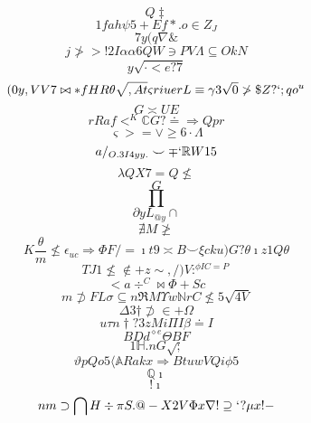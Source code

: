 \documentclass[12pt]{article}
\begin{document}
        \begin{minipage}[t][0pt]{\linewidth}

        \[Q\ddagger\]
\[1fah\psi 5 + E f * . o\in Z_{J}\]
\[7y(q\nabla\&\]
\[j\ngtr > ! 2 I\alpha {\alpha 6 Q W}\ni P V\Lambda\subseteq O k N\]
\[y\sqrt{\cdot < e ? 7}\]
\[(0y,VV7\bowtie * f H R\theta\sqrt{,At}\varsigma r i u e r L\equiv\gamma 3\sqrt{0}\ngtr\$ Z ? ` ; q o^{u}\]
\[G\asymp U E\]
\[rR {a}f<^{K}\mathbb{C} G ?\doteq\Rightarrow Q p r\]
\[\varsigma > =\lor\geq 6\cdot\Lambda\]
\[a/_{O.3I4yy.}\smile\mp `\mathbb{R} W 1 5\]
\[\lambda Q X 7 = Q\nleq\]
\[G\]
\[\prod\]
\[\partial y L_{@y}\cap\]
\[\nexists M\ngeq\]
\[K\frac{\theta}{ m}\nleq\epsilon_{uc}\Rightarrow\Phi F / =\imath t 9\asymp B\smile\xi c k u ) G ?\theta\imath z 1 Q\theta\]
\[TJ1\nleq\notin + z\sim , / ) V :^{\phi I C = P}\]
\[<a\div^{C}\bowtie\Phi + S c\]
\[m\not\supset F L\sigma\subseteq n\Re M\Upsilon w\mathbb{N} r C\nleq 5\sqrt{4V}\]
\[\Delta 3\dagger\not\supset\in +\Omega\]
\[u\tau n\dagger ? 3 z M i\Pi I\beta\doteq I\]
\[BDd^{\diamond e}\Theta B F\]
\[1\mathbb{H} . n G\sqrt{;}\]
\[\vartheta p Q o 5\langle\mathbb{A} R a k x\Longrightarrow B t u w V Q {i}\phi 5\]
\[\mathbb{Q}\imath\]
\[!\imath\]
\[nm\supset\bigcap H\div\pi S . @ - X 2 V\Phi x\nabla !\supseteq ` ?\mu x ! -
        \]
\end{minipage}
\end{document}
